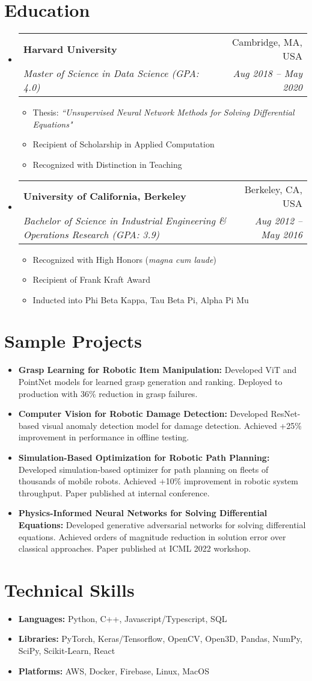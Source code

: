 \documentclass[a4paper,11pt]{article}
\makeatletter
\newcommand{\resumeItem}[1]{
  \item\small{#1}
}
\newcommand{\resumeItemListStart}{\begin{itemize}[rightmargin=0.11in]}
\newcommand{\resumeItemListEnd}{\end{itemize}}
\newcommand{\resumeQuadHeading}[4]{
  \item
  \begin{tabular*}{0.96\textwidth}[t]{l@{\extracolsep{\fill}}r}
    \textbf{#1} & #2 \\
    \textit{\small#3} & \textit{\small #4} \\
  \end{tabular*}
}
\newcommand{\resumeHeadingListStart}{
  \begin{itemize}[leftmargin=0.15in, label={}]
}
\newcommand{\resumeHeadingListEnd}{\end{itemize}}
\makeatother
\begin{document}
\section{Education}
  \resumeHeadingListStart{}
    \resumeQuadHeading{Harvard University}{Cambridge, MA, USA}
    {Master of Science in Data Science (GPA: 4.0)}{Aug 2018 -- May 2020}
    \resumeItemListStart{}
      \resumeItem{Thesis: \textit{``Unsupervised Neural Network Methods for Solving Differential Equations"}}
      \resumeItem{Recipient of Scholarship in Applied Computation}
      \resumeItem{Recognized with Distinction in Teaching}
    \resumeItemListEnd{}
    \resumeQuadHeading{University of California, Berkeley}{Berkeley, CA, USA}
    {Bachelor of Science in Industrial Engineering \& Operations Research (GPA: 3.9)}{Aug 2012 -- May 2016}
    \resumeItemListStart{}
      \resumeItem{Recognized with High Honors (\textit{magna cum laude})}
      \resumeItem{Recipient of Frank Kraft Award}
      \resumeItem{Inducted into Phi Beta Kappa, Tau Beta Pi, Alpha Pi Mu}
    \resumeItemListEnd{}
  \resumeHeadingListEnd{}


\section{Sample Projects}
    \resumeItemListStart{}
        \resumeItem{\textbf{Grasp Learning for Robotic Item Manipulation:} Developed ViT and PointNet models for learned grasp generation and ranking. Deployed to production with 36\% reduction in grasp failures.}
        \resumeItem{\textbf{Computer Vision for Robotic Damage Detection:} Developed ResNet-based visual anomaly detection model for damage detection. Achieved +25\% improvement in performance in offline testing.}
        \resumeItem{\textbf{Simulation-Based Optimization for Robotic Path Planning:} Developed simulation-based optimizer for path planning on fleets of thousands of mobile robots. Achieved +10\% improvement in robotic system throughput. Paper published at internal conference.}
        \resumeItem{\textbf{Physics-Informed Neural Networks for Solving Differential Equations:} Developed generative adversarial networks for solving differential equations. Achieved orders of magnitude reduction in solution error over classical approaches. Paper published at ICML 2022 workshop.}
    \resumeItemListEnd{}


\section{Technical Skills}
    \resumeItemListStart{}
        \resumeItem{\textbf{Languages:} Python, C++, Javascript/Typescript, SQL}
        \resumeItem{\textbf{Libraries:} PyTorch, Keras/Tensorflow, OpenCV, Open3D, Pandas, NumPy, SciPy, Scikit-Learn, React}
        \resumeItem{\textbf{Platforms:} AWS, Docker, Firebase, Linux, MacOS}
    \resumeItemListEnd{}
\end{document}
